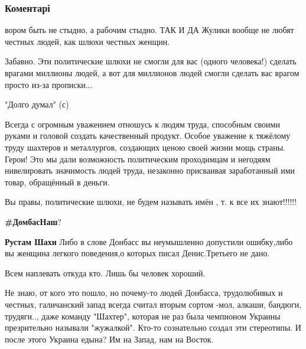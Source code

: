  
 
 
 
 
\subsubsection{Коментарі}
\label{sec:01_11_2021.fb.zharkih_denis.1.donbass_ljudi.cmt}

\begin{itemize} %
вором быть не стыдно, а рабочим стыдно. ТАК И ДА Жулики вообще не любят честных людей, как шлюхи честных женщин.


Забавно. Эти политические шлюхи не смогли для вас (одного человека!) сделать
врагами миллионы людей, а вот для миллионов людей смогли сделать вас врагом
просто из-за прописки...

"Долго думал" (с)


Всегда с огромным уважением отношусь к людям труда, способным своими руками и
головой создать качественный продукт. Особое уважение к тяжёлому труду шахтеров
и металлургов, создающих ценою своей жизни мощь страны. Герои! Это мы дали
возможность политическим проходимцам и негодяям нивелировать значимость людей
труда, незаконно присваивая заработанный ими товар, обращённый в деньги.

Вы правы, политические шлюхи, не будем называть имён , т. к все их знают!!!!!!

\textbf{\#ДомбасНаш}?

\begin{itemize} %
\textbf{Рустам Шахи} Либо в слове Донбасс вы неумышленно допустили ошибку,либо вы женщина легкого поведения,о которых писал Денис.Третьего не дано.
\end{itemize} %

Всем наплевать откуда кто.
Лишь бы человек хороший.


Не знаю, от кого это пошло, но почему-то людей Донбасса, трудолюбивых и
честных, галичанский запад всегда считал вторым сортом -мол, алкаши, бандюги,
трудяги.., даже команду "Шахтер", которая не раз была чемпионом Украины
презрительно называли "жужалкой". Кто-то сознательно создал эти стереотипы. И
после этого Украина едына? Им на Запад, нам на Восток.


\end{itemize}
